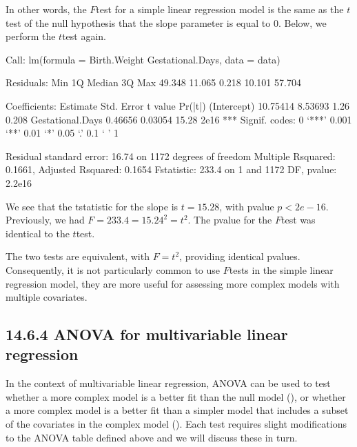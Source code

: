 \documentclass[letterpaper,10pt,english]{jupyterBook}
\begin{document}
\sphinxAtStartPar
In other words, the \(F\)\sphinxhyphen{}test for a simple linear regression model is the same as the \(t\)\sphinxhyphen{}test of the null hypothesis that the slope parameter is equal to 0. Below, we perform the \(t\)\sphinxhyphen{}test again.

\begin{sphinxVerbatim}[commandchars=\\\{\}]
\end{sphinxVerbatim}

\begin{sphinxVerbatim}[commandchars=\\\{\}]
Call:
lm(formula = Birth.Weight \PYGZti{} Gestational.Days, data = data)

Residuals:
    Min      1Q  Median      3Q     Max 
\PYGZhy{}49.348 \PYGZhy{}11.065   0.218  10.101  57.704 

Coefficients:
                  Estimate Std. Error t value Pr(\PYGZgt{}|t|)    
(Intercept)      \PYGZhy{}10.75414    8.53693   \PYGZhy{}1.26    0.208    
Gestational.Days   0.46656    0.03054   15.28   \PYGZlt{}2e\PYGZhy{}16 ***
\PYGZhy{}\PYGZhy{}\PYGZhy{}
Signif. codes:  0 ‘***’ 0.001 ‘**’ 0.01 ‘*’ 0.05 ‘.’ 0.1 ‘ ’ 1

Residual standard error: 16.74 on 1172 degrees of freedom
Multiple R\PYGZhy{}squared:  0.1661,	Adjusted R\PYGZhy{}squared:  0.1654 
F\PYGZhy{}statistic: 233.4 on 1 and 1172 DF,  p\PYGZhy{}value: \PYGZlt{} 2.2e\PYGZhy{}16
\end{sphinxVerbatim}

\sphinxAtStartPar
We see that the t\sphinxhyphen{}statistic for the slope is \(t=15.28\), with p\sphinxhyphen{}value \(p<2e-16\). Previously, we had \(F=233.4=15.24^2=t^2\). The p\sphinxhyphen{}value for the \(F\)\sphinxhyphen{}test was identical to the \(t\)\sphinxhyphen{}test.

\sphinxAtStartPar
The two tests are equivalent, with \(F=t^2\), providing identical p\sphinxhyphen{}values. Consequently, it is not particularly common to use \(F\)\sphinxhyphen{}tests in the simple linear regression model, they are more useful for assessing more complex models with multiple covariates.


\subsection{14.6.4 ANOVA for multivariable linear regression}
\label{\detokenize{14.g. Linear Regression III:anova-for-multivariable-linear-regression}}
\sphinxAtStartPar
In the context of multivariable linear regression, ANOVA can be used to test whether a more complex model is a better fit than the null model (), or whether a more complex model is a better fit than a simpler model that includes a subset of the covariates in the complex model (). Each test requires slight modifications to the ANOVA table defined above and we will discuss these in turn.
\end{document}
